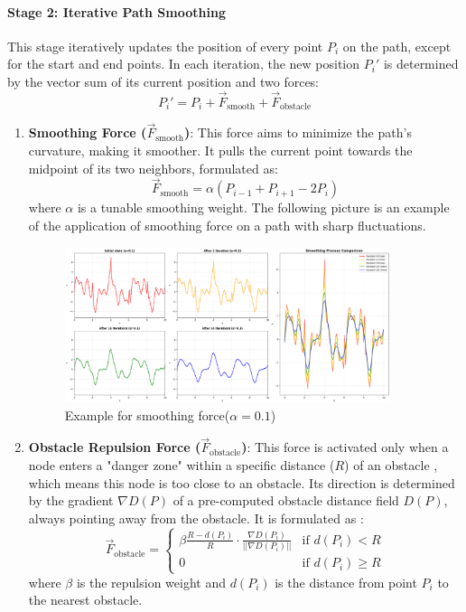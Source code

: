 \documentclass[aps,letterpaper,10pt]{revtex4}
\begin{document}
\paragraph{Stage 2: Iterative Path Smoothing}
This stage iteratively updates the position of every point $P_i$ on the path, except for the start and end points. In each iteration, the new position $P_i'$ is determined by the vector sum of its current position and two forces:
$$ P_i' = P_i + \vec{F}_{\text{smooth}} + \vec{F}_{\text{obstacle}} $$
\begin{enumerate}
    \item \textbf{Smoothing Force ($\vec{F}_{\text{smooth}}$)}: This force aims to minimize the path's curvature, making it smoother. It pulls the current point towards the midpoint of its two neighbors, formulated as:
    $$ \vec{F}_{\text{smooth}} = \alpha (P_{i-1} + P_{i+1} - 2P_i) $$
    where $\alpha$ is a tunable smoothing weight.
	The following picture is an example of the application of smoothing force on a path with sharp fluctuations.
	\begin{figure}[h!]
		\centering %
		\includegraphics[width=0.9\textwidth]{smooth_force.png} %
		\caption{Example for smoothing force($\alpha=0.1$)} %
		\label{fig:logo} %
	\end{figure}


	\newpage
    \item \textbf{Obstacle Repulsion Force ($\vec{F}_{\text{obstacle}}$)}: This force is activated only when a node enters a "danger zone" within a specific distance ($R$) of an obstacle , which means this node is too close to an obstacle. Its direction is determined by the gradient $\nabla D(P)$ of a pre-computed obstacle distance field $D(P)$, always pointing away from the obstacle. It is formulated as :
    $$
    \vec{F}_{\text{obstacle}} = 
    \begin{cases} 
      \beta \frac{R - d(P_i)}{R} \cdot \frac{\nabla D(P_i)}{||\nabla D(P_i)||} & \text{if } d(P_i) < R \\
      0 & \text{if } d(P_i) \ge R
    \end{cases}
    $$
    where $\beta$ is the repulsion weight and $d(P_i)$ is the distance from point $P_i$ to the nearest obstacle.


\end{enumerate}
\end{document}
